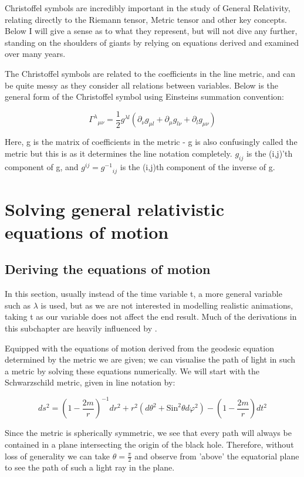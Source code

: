 \documentclass[oneside,openright,frontopenright]{dmathesis}
\begin{document}
	Christoffel symbols are incredibly important in the study of General Relativity, relating directly to the Riemann tensor, Metric tensor and other key concepts. Below I will give a sense as to what they represent, but will not dive any further, standing on the shoulders of giants by relying on equations derived and examined over many years.

	The Christoffel symbols are related to the coefficients in the line metric, and can be quite messy as they consider all relations between variables. Below is the general form of the Christoffel symbol using Einsteins summation convention\cite{albert1916foundation}:
	
	\[{\Gamma^\lambda}_{\mu\nu} = \frac{1}{2}g^{\lambda{l}}(\partial_{\nu}g_{\mu{l}} + \partial_{\mu}g_{l\nu} + \partial_{l}g_{\mu\nu})\]
	
	Here, g is the matrix of coefficients in the metric - g is also confusingly called the metric but this is as it determines the line notation completely. $g_{ij}$ is the (i,j)'th component of g, and $g^{ij} = {g^{-1}}_{ij}$ is the (i,j)th component of the inverse of g.

\chapter{Solving general relativistic equations of motion}
\section{Deriving the equations of motion}
	
	In this section, usually instead of the time variable t, a more general variable such as $\lambda$ is used, but as we are not interested in modelling realistic animations, taking t as our variable does not affect the end result. Much of the derivations in this subchapter are heavily influenced by \cite{schutz2009first}.
	
	Equipped with the equations of motion derived from the geodesic equation determined by the metric we are given; we can visualise the path of light in such a metric by solving these equations numerically. We will start with the Schwarzschild metric, given in line notation by\cite{derivationSchwarzschild}: 


	\[{ds^{2} = {\left(1-\frac {2m}{r}\right)}^{-1}} {dr^2} + {r^2}({d\theta ^2} + {\mbox{Sin} ^2}{\theta}{d\varphi ^2}) -{\left(1-\frac {2m}{r}\right)}{dt^2}\]


	Since the metric is spherically symmetric, we see that every path will always be contained in a plane intersecting the origin of the black hole. Therefore, without loss of generality we can take ${\theta}=\frac{\pi}{2}$ and observe from 'above’ the equatorial plane to see the path of such a light ray in the plane.
\end{document}
